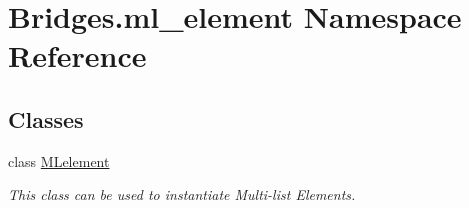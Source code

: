 \hypertarget{namespace_bridges_1_1ml__element}{}\section{Bridges.\+ml\+\_\+element Namespace Reference}
\label{namespace_bridges_1_1ml__element}
\subsection*{Classes}
\begin{DoxyCompactItemize}
\item 
class \hyperlink{class_bridges_1_1ml__element_1_1_m_lelement}{M\+Lelement}
\begin{DoxyCompactList}\small\item\em This class can be used to instantiate Multi-\/list Elements. \end{DoxyCompactList}\end{DoxyCompactItemize}
